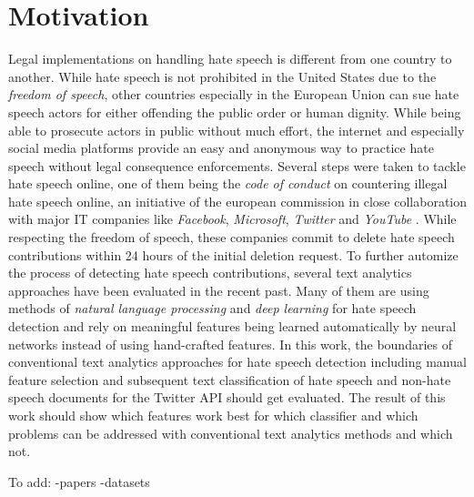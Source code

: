 \section{Motivation}

Legal implementations on handling hate speech is different from one country to another. While hate speech is not prohibited in the United States due to the \textit{freedom of speech}, other countries especially in the European Union can sue hate speech actors for either offending the public order or human dignity. While being able to prosecute actors in public without much effort, the internet and especially social media platforms provide an easy and anonymous way to practice hate speech without legal consequence enforcements. Several steps were taken to tackle hate speech online, one of them being the \textit{code of conduct} on countering illegal hate speech online, an initiative of the european commission in close collaboration with major IT companies like \textit{Facebook}, \textit{Microsoft}, \textit{Twitter} and \textit{YouTube} \cite{EuropeanCommission.20200622}. While respecting the freedom of speech, these companies commit to delete hate speech contributions within 24 hours of the initial deletion request. To further automize the process of detecting hate speech contributions, several text analytics approaches have been evaluated in the recent past. Many of them are using methods of \textit{natural language processing} and \textit{deep learning} for hate speech detection and rely on meaningful features being learned automatically by neural networks instead of using hand-crafted features. In this work, the boundaries of conventional text analytics approaches for hate speech detection including manual feature selection and subsequent text classification of hate speech and non-hate speech documents for the Twitter API should get evaluated. The result of this work should show which features work best for which classifier and which problems can be addressed with conventional text analytics methods and which not. 

To add:
-papers
-datasets
